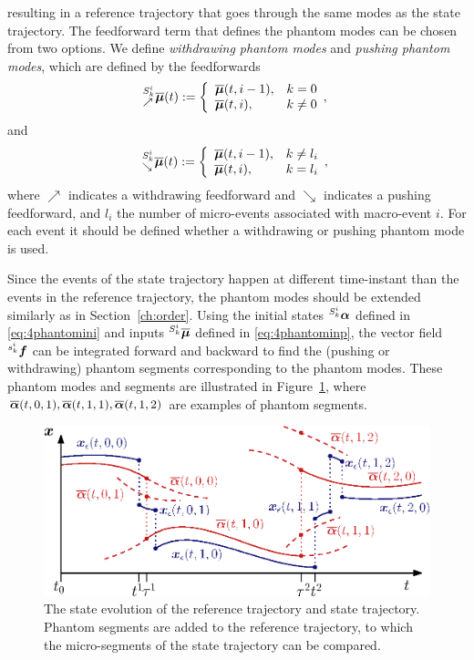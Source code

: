 \documentclass[../DC2017114Bouma.tex]{subfiles}
\begin{document}
resulting in a reference trajectory that goes through the same modes as the state trajectory. The feedforward term that defines the phantom modes can be chosen from two options. We define \textit{withdrawing phantom modes} and \textit{pushing phantom modes}, which are defined by the feedforwards
\begin{equation}
\hspace{0cm}^{S_k^i}_{\nearrow}\overline{\boldsymbol{\mu}}(t) := \left\lbrace\begin{array}{ll}
\overline{\boldsymbol{\mu}}(t,i-1), & k = 0\\
\overline{\boldsymbol{\mu}}(t,i), & k \neq 0
\end{array},\right.
\end{equation}
and
\begin{equation}
\hspace{0cm}^{S_k^i}_{\searrow}\overline{\boldsymbol{\mu}}(t) := \left\lbrace\begin{array}{ll}
\overline{\boldsymbol{\mu}}(t,i-1), & k \neq l_i\\
\overline{\boldsymbol{\mu}}(t,i), & k = l_i
\end{array},\right.\label{eq:4phantominp}
\end{equation}
%
where $\nearrow$ indicates a withdrawing feedforward and $\searrow$ indicates a pushing feedforward, and $l_i$ the number of micro-events associated with macro-event $i$. For each event it should be defined whether a withdrawing or pushing phantom mode is used. 

Since the events of the state trajectory happen at different time-instant than the events in the reference trajectory, the phantom modes should be extended similarly as in Section~\ref{ch:order}. 
Using the initial states $\hspace{0cm}^{S^i_{k}}\boldsymbol{\alpha}$ defined in \eqref{eq:4phantomini} and inputs $\hspace{0cm}^{S_k^i}\overline{\boldsymbol{\mu}}$ defined in \eqref{eq:4phantominp}, the vector field $\hspace{0cm}^{s_k^i}{\boldsymbol{f}}$ can be integrated forward and backward to find the (pushing or withdrawing) phantom segments corresponding to the phantom modes. These phantom modes and segments are illustrated in Figure~\ref{fig:4simulmicro}, where $\overline{\boldsymbol{\alpha}}(t,0,1),\overline{\boldsymbol{\alpha}}(t,1,1),\overline{\boldsymbol{\alpha}}(t,1,2)$ are examples of phantom segments.
\begin{figure}[h]
\centering
\includegraphics[width=.8\textwidth]{simulmicro.eps}\caption{The state evolution of the reference trajectory and state trajectory. Phantom segments are added to the reference trajectory, to which the micro-segments of the state trajectory can be compared.}\label{fig:4simulmicro}
\end{figure}
\end{document}
